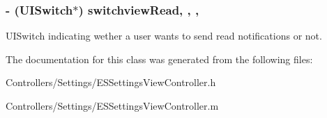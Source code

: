 \subsubsection[{switchview\+Read}]{\setlength{\rightskip}{0pt plus 5cm}-\/ (U\+I\+Switch$\ast$) switchview\+Read\hspace{0.3cm}{\ttfamily [read]}, {\ttfamily [write]}, {\ttfamily [nonatomic]}, {\ttfamily [retain]}}\label{interface_e_s_settings_view_controller_a58f2451a126bb78283fe7db9e55a4e6f}
U\+I\+Switch indicating wether a user wants to send read notifications or not. 

The documentation for this class was generated from the following files\+:\begin{DoxyCompactItemize}
\item 
Controllers/\+Settings/E\+S\+Settings\+View\+Controller.\+h\item 
Controllers/\+Settings/E\+S\+Settings\+View\+Controller.\+m\end{DoxyCompactItemize}
